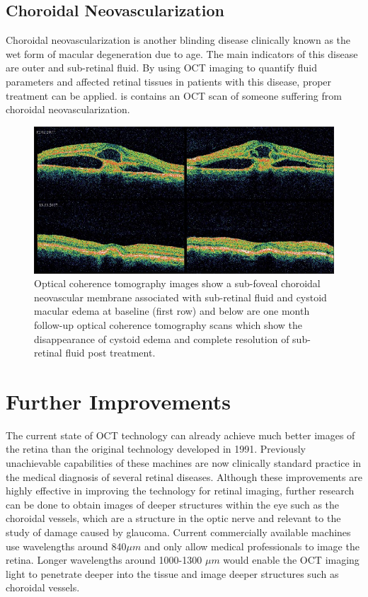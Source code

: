 \subsection{Choroidal Neovascularization}
Choroidal neovascularization is another blinding disease clinically known as the wet form of macular degeneration due to age.  The main indicators of this disease are outer and sub-retinal fluid. \cite{mbib_4}  By using OCT imaging to quantify fluid parameters and affected retinal tissues in patients with this disease, proper treatment can be applied.\cite{mbib_4}  is contains an OCT scan of someone suffering from choroidal neovascularization.

\begin{figure}[htbp]
\centering
\includegraphics{figures/morgan_8}
\caption{ Optical coherence tomography images show a sub-foveal choroidal neovascular membrane associated with sub-retinal fluid and cystoid macular edema at baseline (first row) and below are one month follow-up optical coherence tomography scans which show the disappearance of cystoid edema and complete resolution of sub-retinal fluid post treatment. \cite{mbib_11} }
\label{fig:m_8}
\end{figure}

\section{Further Improvements}
The current state of OCT technology can already achieve much better images 
of the retina than the
original technology developed in 1991.  Previously unachievable
capabilities of these machines are now clinically standard practice in the
medical diagnosis of several retinal diseases.  Although these improvements
are highly effective in improving the technology for retinal imaging, further
research can be done to obtain images of deeper structures within the eye such
as the choroidal vessels, which are a structure in the optic nerve and
relevant to the study of damage caused by glaucoma. \cite{mbib_4}  Current
commercially available
machines use wavelengths around 840$\mu m$ and only allow medical professionals
to image the retina.  Longer wavelengths around 1000-1300 $\mu m$ would enable
the OCT imaging light to penetrate deeper into the tissue and image deeper
structures such as choroidal vessels. \cite{mbib_4}
